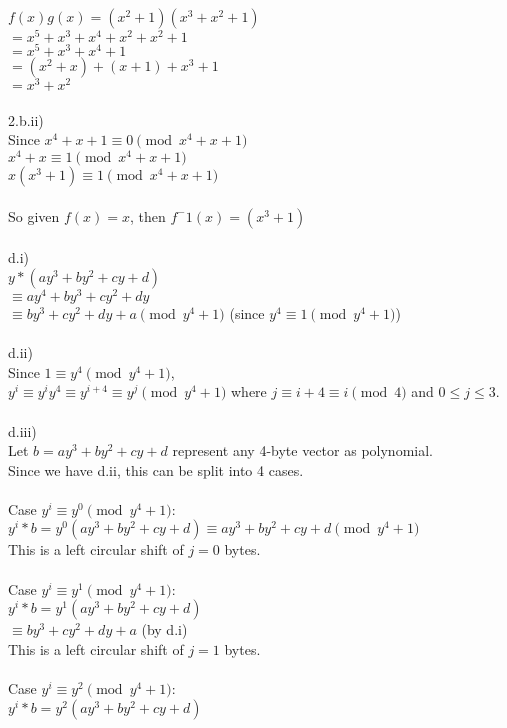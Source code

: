 \documentclass{assignment}
\newcommand\tab[1][0.5cm]{\hspace*{#1}}
\begin{document}
\begin{problemlist}
\begin{problem}
\begin{answer}
$f(x)g(x)=(x^2+1)(x^3+x^2+1)$\\
$=x^5+x^3+x^4+x^2+x^2+1$\\
$=x^5+x^3+x^4+1$\\
$=(x^2+x)+(x+1)+x^3+1$\\
$=x^3+x^2$\\
\\
2.b.ii)\\
Since $x^4+x+1\equiv 0  \pmod{x^4+x+1}$\\
$x^4+x\equiv 1  \pmod{x^4+x+1}$\\
$x(x^3+1)\equiv 1  \pmod{x^4+x+1}$\\
\\
So given $f(x)=x$, then $f^-1(x)=(x^3+1)$\\
\\
d.i)\\
$y*(ay^3+by^2+cy+d)$\\
$\equiv ay^4+by^3+cy^2+dy$\\
$\equiv by^3+cy^2+dy+a \pmod {y^4+1}$ \tab (since $y^4\equiv 1 \pmod {y^4+1}$)\\
\\
d.ii)\\
Since $1\equiv y^4 \pmod {y^4+1}$,\\
$y^i\equiv y^iy^4\equiv y^{i+4}\equiv y^j \pmod {y^4+1}$ where $j\equiv i+4\equiv i \pmod 4$ and $0\leq j \leq 3$.\\
\\
d.iii)\\
Let $b=ay^3+by^2+cy+d$ represent any 4-byte vector as polynomial.\\
Since we have d.ii, this can be split into 4 cases.\\
\\
Case $y^i\equiv y^0 \pmod {y^4+1}$: \\
\tab$y^i*b=y^0(ay^3+by^2+cy+d)\equiv ay^3+by^2+cy+d \pmod {y^4+1}$ \\
\tab This is a left circular shift of $j=0$ bytes.\\
\\
Case $y^i\equiv y^1 \pmod {y^4+1}$: \\
\tab$y^i*b=y^1(ay^3+by^2+cy+d)$\\
\tab$\equiv by^3+cy^2+dy+a$  \tab (by d.i)\\
\tab This is a left circular shift of $j=1$ bytes.\\
\\
Case $y^i\equiv y^2 \pmod {y^4+1}$: \\
\tab$y^i*b=y^2(ay^3+by^2+cy+d)$\\

\end{answer}
\end{problem}
\end{problemlist}
\end{document}
